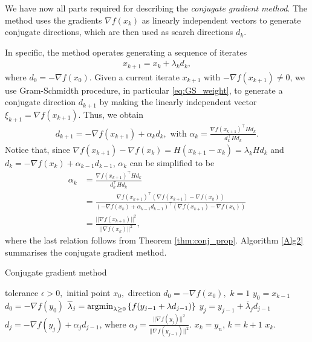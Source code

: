 We have now all parts required for describing the \emph{conjugate gradient method}. The method uses the gradients $\nabla f(x_k)$ as linearly independent vectors to generate conjugate directions, which are then used as search directions $d_k$.

In specific, the method operates generating a sequence of iterates
%
\begin{align*}
	x_{k+1} = x_k + \lambda_k d_k,	
\end{align*}
%
where $d_0 = -\nabla f(x_0)$. Given a current iterate $x_{k+1}$ with $-\nabla f (x_{k+1}) \neq 0$, we use Gram-Schmidth procedure, in particular \eqref{eq:GS_weight}, to generate a conjugate direction $d_{k+1}$ by making the linearly independent vector $\xi_{k+1} = \nabla f(x_{k+1})$. Thus, we obtain
%
\begin{align}
d_{k+1} = -\nabla f(x_{k+1}) + \alpha_kd_k, \text{ with } \alpha_k = \frac{\nabla f(x_{k+1})^\top H d_k}{d_k^\top Hd_k}. \label{eq:conj_grad}
\end{align}
%
Notice that, since $\nabla f(x_{k+1}) - \nabla f(x_k) = H(x_{k+1} - x_k) = \lambda_k H d_k$ and  $d_k= - \nabla f(x_k) + \alpha_{k-1}d_{k-1}$, $\alpha_k$ can be simplified to be
%
\begin{align*}
	\alpha_k &= \frac{\nabla f(x_{k+1})^\top H d_k}{d_k^\top Hd_k} \\
	&= \frac{\nabla f(x_{k+1})^\top (\nabla f(x_{k+1}) - \nabla f(x_k))}{(- \nabla f(x_k) + \alpha_{k-1}d_{k-1})^\top (\nabla f(x_{k+1}) - \nabla f(x_k))} \\
	&= \frac{||\nabla f(x_{k+1})||^2}{||\nabla f(x_k)||^2},
\end{align*}
where the last relation follows from Theorem \ref{thm:conj_prop}. Algorithm \ref{Alg2} summarises the conjugate gradient method. 


\begin{algorithm}[H]
\caption{Conjugate gradient method} \label{Alg2}
\begin{algorithmic}[1] %
 tolerance $\epsilon > 0,$ initial point $x_0,$ direction $d_0 = - \nabla f(x_0),$ $k = 1$ 
	\State $y_0 = x_{k-1}$
	\State $d_0 = -\nabla f(y_0)$
     \label{alg:conj_restart}      
        \State $\overline{\lambda}_j = \mathop{\rm argmin}_{\lambda \geq 0}\left\{ f(y_{j-1} + \lambda d_{j-1}) \right \}$
        \State $y_{j} = y_{j-1} + \overline{\lambda}_j d_{j-1}$
        \State $d_{j} = -\nabla f(y_{j}) + \alpha_jd_{j-1}$, where $\alpha_j = \frac{||\nabla f(y_{j})||^2}{||\nabla f(y_{j-1})||^2}$.
    \EndFor
    \State $x_k = y_n$, $k = k+1$
\EndWhile
{} $x_k$.
\end{algorithmic}
\end{algorithm}

